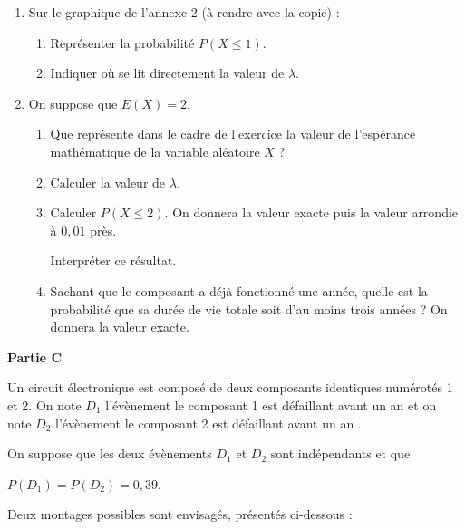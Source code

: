 \documentclass[12pt,french]{article}
\begin{document}
\begin{question}[subtitle={Antilles Guyane 2015}]
\begin{enumerate}
\item Sur le graphique de l'annexe 2 (à rendre avec la copie) :
	\begin{enumerate}
		\item Représenter la probabilité $P(X \leqslant  1)$.
		\item Indiquer où se lit directement la valeur de $\lambda$.
 	\end{enumerate}
\item  On suppose que $E(X) = 2$.
	\begin{enumerate}
		\item Que représente dans le cadre de l'exercice la valeur de l'espérance mathématique de la
variable aléatoire $X$ ?
		\item Calculer la valeur de $\lambda$.
		\item Calculer $P(X \leqslant 2)$. On donnera la valeur exacte puis la valeur arrondie à $0,01$ près.
		
Interpréter ce résultat.
		\item Sachant que le composant a déjà fonctionné une année, quelle est la probabilité que sa
durée de vie totale soit d'au moins trois années ? On donnera la valeur exacte.
	\end{enumerate}
\end{enumerate}

\bigskip

\textbf{Partie C}

\medskip

Un circuit électronique est composé de deux composants identiques numérotés 1 et 2.
On note $D_1$ l'évènement \og le composant 1 est défaillant avant un an \fg{} et on note $D_2$ l'évènement \og le composant 2 est défaillant avant un an \fg.

On suppose que les deux évènements $D_1$ et $D_2$ sont indépendants et que 

$P\left(D_1\right) = P\left(D_2\right) = 0,39$.

Deux montages possibles sont envisagés, présentés ci-dessous :

\begin{center}
\end{center}


\end{question}
\end{document}
